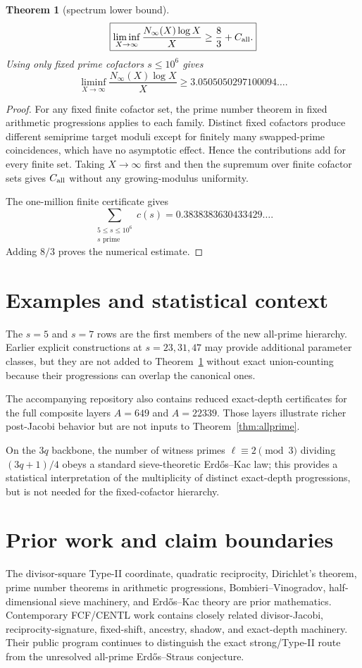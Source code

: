 \documentclass[11pt]{article}
\newtheorem{theorem}{Theorem}
\theoremstyle{definition}
\begin{document}
\begin{theorem}[spectrum lower bound]\label{thm:count}
\[
\boxed{
\liminf_{X\to\infty}
\frac{N_\infty(X)\log X}{X}
\ge\frac83+C_{\rm all}.
}
\]
Using only fixed prime cofactors $s\le10^6$ gives
\[
\boxed{
\liminf_{X\to\infty}
\frac{N_\infty(X)\log X}{X}
\ge3.0505050297100094\ldots .
}
\]
\end{theorem}

\begin{proof}
For any fixed finite cofactor set, the prime number theorem in fixed arithmetic progressions applies to each family. Distinct fixed cofactors produce different semiprime target moduli except for finitely many swapped-prime coincidences, which have no asymptotic effect. Hence the contributions add for every finite set. Taking $X\to\infty$ first and then the supremum over finite cofactor sets gives $C_{\rm all}$ without any growing-modulus uniformity.

The one-million finite certificate gives
\[
\sum_{\substack{5\le s\le10^6\\s\text{ prime}}}c(s)
=0.3838383630433429\ldots .
\]
Adding $8/3$ proves the numerical estimate.
\end{proof}

\section{Examples and statistical context}
The $s=5$ and $s=7$ rows are the first members of the new all-prime hierarchy. Earlier explicit constructions at $s=23,31,47$ may provide additional parameter classes, but they are not added to Theorem~\ref{thm:count} without exact union-counting because their progressions can overlap the canonical ones.

The accompanying repository also contains reduced exact-depth certificates for the full composite layers $A=649$ and $A=22339$. Those layers illustrate richer post-Jacobi behavior but are not inputs to Theorem~\ref{thm:allprime}.

On the $3q$ backbone, the number of witness primes $\ell\equiv2\pmod3$ dividing $(3q+1)/4$ obeys a standard sieve-theoretic Erd\H{o}s--Kac law; this provides a statistical interpretation of the multiplicity of distinct exact-depth progressions, but is not needed for the fixed-cofactor hierarchy.

\section{Prior work and claim boundaries}
The divisor-square Type-II coordinate, quadratic reciprocity, Dirichlet's theorem, prime number theorems in arithmetic progressions, Bombieri--Vinogradov, half-dimensional sieve machinery, and Erd\H{o}s--Kac theory are prior mathematics. Contemporary FCF/CENTL work contains closely related divisor-Jacobi, reciprocity-signature, fixed-shift, ancestry, shadow, and exact-depth machinery. Their public program continues to distinguish the exact strong/Type-II route from the unresolved all-prime Erd\H{o}s--Straus conjecture.
\end{document}
